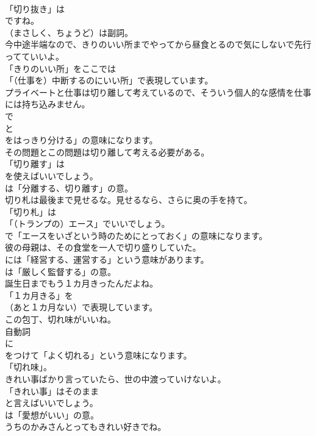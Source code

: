 \documentclass[8pt]{extreport}
\begin{document}
\begin{CJK}{UTF8}{min}
\\	「切り抜き」は
\\	ですね。
\\	（まさしく、ちょうど）は副詞。	
\\	今中途半端なので、きりのいい所までやってから昼食とるので気にしないで先行ってていいよ。 
\\	「きりのいい所」をここでは
\\	「（仕事を）中断するのにいい所」で表現しています。	
\\	プライベートと仕事は切り離して考えているので、そういう個人的な感情を仕事には持ち込みません。 
\\	で
\\	と
\\	をはっきり分ける」の意味になります。	
\\	その問題とこの問題は切り離して考える必要がある。 
\\	「切り離す」は
\\	を使えばいいでしょう。
\\	は「分離する、切り離す」の意。	
\\	切り札は最後まで見せるな。見せるなら、さらに奥の手を持て。 
\\	「切り札」は
\\	「（トランプの）エース」でいいでしょう。
\\	で「エースをいざという時のためにとっておく」の意味になります。	
\\	彼の母親は、その食堂を一人で切り盛りしていた。 
\\	には「経営する、運営する」という意味があります。
\\	は「厳しく監督する」の意。	
\\	誕生日までもう１カ月きったんだよね。 
\\	「１カ月きる」を 
\\	（あと１カ月ない）で表現しています。	
\\	この包丁、切れ味がいいね。 
\\	自動詞
\\	に
\\	をつけて「よく切れる」という意味になります。
\\	「切れ味」。	
\\	きれい事ばかり言っていたら、世の中渡っていけないよ。 
\\	「きれい事」はそのまま
\\	と言えばいいでしょう。
\\	は「愛想がいい」の意。	
\\	うちのかみさんとってもきれい好きでね。 

\end{CJK}
\end{document}
